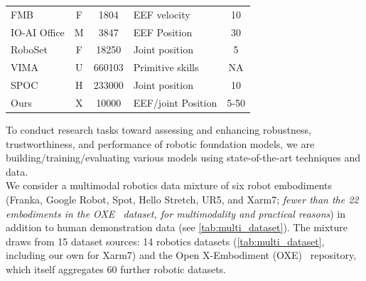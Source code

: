 \begin{table}
{\begin{tabular}{lcclc}
FMB \cite{luo2024fmb}                           & F        & 1804        & EEF velocity                           & 10                                                  \\
IO-AI Office \cite{9}    & M        & 3847        & EEF Position                           & 30                                                       \\
RoboSet\cite{bharadhwaj2023roboagent}                     & F        & 18250       & Joint position                         & 5                                        \\
VIMA \cite{jiang2023vima}                        & U          & 660103      & Primitive skills                       & NA                                               \\
SPOC \cite{spoc2023}                       & H & 233000      & Joint position                         & 10                                                     \\
Ours & X & 10000 & EEF/joint Position & 5-50 \\
\bottomrule
\end{tabular}}\vspace{-2ex}
\end{table}
To conduct research tasks toward assessing and enhancing robustness, trustworthiness, and performance of robotic foundation models, we are  building/training/evaluating various models using state-of-the-art techniques and \xot data.\\
 We consider a multimodal robotics data mixture of
six robot embodiments (Franka, Google Robot, Spot, Hello Stretch, UR5, and Xarm7; \textit{fewer than the 22 embodiments in the OXE~\cite{9} dataset, for multimodality and practical reasons}) in addition to human demonstration data (see \autoref{tab:multi_dataset}). The mixture draws from 15 dataset sources: 14 robotics datasets (\autoref{tab:multi_dataset}, including our own for Xarm7) and the Open X-Embodiment (OXE)~\cite{9} repository, which itself aggregates 60 further robotic datasets.
